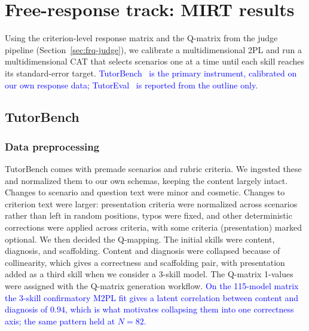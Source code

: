 \providecommand{\aiadd}[1]{\textcolor{blue}{#1}}
\providecommand{\aibullets}[1]{{\color{blue}#1}}

\section{Free-response track: MIRT results}
\label{sec:frq-mirt}

Using the criterion-level response matrix and the Q-matrix from the judge
pipeline (Section~\ref{sec:frq-judge}), we calibrate a multidimensional 2PL and
run a multidimensional CAT that selects scenarios one at a time until each skill
reaches its standard-error target.
\aiadd{TutorBench~\cite{srinivasa2025tutorbench} is the primary instrument,
calibrated on our own response data; TutorEval~\cite{chevalier2024language} is
reported from the outline only.}

\subsection{TutorBench}
\label{sec:frq-mirt-tb}

\subsubsection{Data preprocessing}
TutorBench comes with premade scenarios and rubric criteria. We ingested these
and normalized them to our own schemas, keeping the content largely intact.
Changes to scenario and question text were minor and cosmetic. Changes to
criterion text were larger: presentation criteria were normalized across
scenarios rather than left in random positions, typos were fixed, and other
deterministic corrections were applied across criteria, with some criteria
(presentation) marked optional. We then decided the Q-mapping. The initial
skills were content, diagnosis, and scaffolding. Content and diagnosis were
collapsed because of collinearity, which gives a correctness and scaffolding
pair, with presentation added as a third skill when we consider a 3-skill model.
The Q-matrix 1-values were assigned with the Q-matrix generation workflow.
\aiadd{On the 115-model matrix the 3-skill confirmatory M2PL fit gives a latent
correlation between content and diagnosis of $0.94$, which is what motivates
collapsing them into one correctness axis; the same pattern held at $N=82$.}

